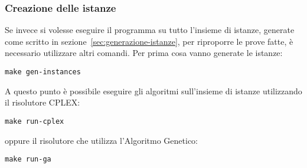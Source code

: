 \subsubsection{Creazione delle istanze}\label{subsubsec:creazione-istanze-note}
Se invece si volesse eseguire il programma su tutto l'insieme di istanze, generate
come scritto in sezione~\ref{sec:generazione-istanze}, per riproporre le prove fatte, è necessario utilizzare altri comandi.
Per prima cosa vanno generate le istanze:
\label{lst:make-passo-5}
\begin{lstlisting}[style=BashStyle]
make gen-instances
\end{lstlisting}
A questo punto è possibile eseguire gli algoritmi sull'insieme di istanze utilizzando il risolutore CPLEX:
\label{lst:make-passo-6}
\begin{lstlisting}[style=BashStyle]
make run-cplex
\end{lstlisting}
oppure il risolutore che utilizza l'Algoritmo Genetico:
\label{lst:make-passo-7}
\begin{lstlisting}[style=BashStyle]
make run-ga
\end{lstlisting}
